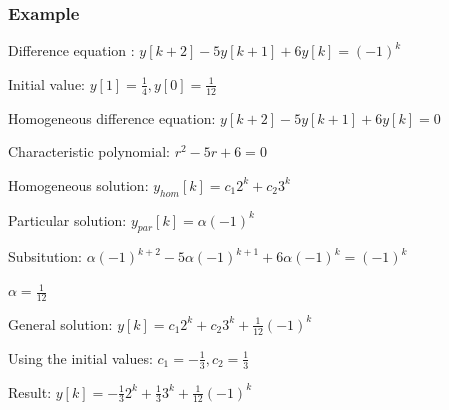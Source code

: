 \begin{frame}
	\frametitle{Example}
	\begin{example}
		\begin{itemize}
			\setlength\itemsep{0em}
			\small{
			\item Difference equation : $y[k+2] - 5y[k+1]+6y[k]=(-1)^k$
			\item Initial value:  $y[1] = \frac{1}{4}, y[0] = \frac{1}{12}$
			\item Homogeneous difference equation: $y[k+2] - 5y[k+1]+6y[k] = 0$
			\item Characteristic polynomial: $r^2-5r+6 = 0$
			\item Homogeneous solution: $y_{hom}[k] = c_{1}2^{k} + c_{2}3^{k}$
			\item Particular solution: $y_{par}[k] = \alpha(-1)^k$
			\item Subsitution: $\alpha(-1)^{k+2}-5\alpha(-1)^{k+1}+6\alpha(-1)^k = (-1)^k$
			\item $\alpha = \frac{1}{12}$
			\item General solution: $y[k] = c_{1}2^{k}+c_{2}3^{k}+\frac{1}{12}(-1)^{k}$
			\item Using the initial values: $c_1 = -\frac{1}{3}, c_{2} = \frac{1}{3}$
			\item Result:  $y[k]= -\frac{1}{3}2^{k}+\frac{1}{3}3^{k}+\frac{1}{12}(-1)^{k}$}
		\end{itemize}
	\end{example}

\end{frame}
